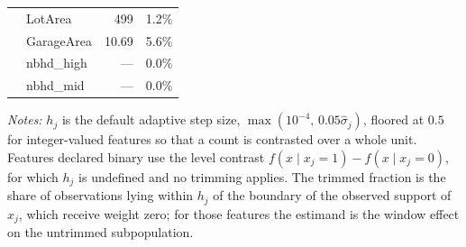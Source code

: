 \begin{table}[htbp]
\begin{threeparttable}
\begin{tabular}{llrr}
 & LotArea & 499 & 1.2\% \\
 & GarageArea & 10.69 & 5.6\% \\
 & nbhd\_high & --- & 0.0\% \\
 & nbhd\_mid & --- & 0.0\% \\
\bottomrule
\end{tabular}
\begin{tablenotes}
\footnotesize
\item \textit{Notes:} $h_j$ is the default adaptive step size, $\max(10^{-4},\, 0.05\hat{\sigma}_j)$, floored at $0.5$ for integer-valued features so that a count is contrasted over a whole unit. Features declared binary use the level contrast $f(x \mid x_j=1) - f(x \mid x_j=0)$, for which $h_j$ is undefined and no trimming applies. The trimmed fraction is the share of observations lying within $h_j$ of the boundary of the observed support of $x_j$, which receive weight zero; for those features the estimand is the window effect on the untrimmed subpopulation.
\end{tablenotes}
\end{threeparttable}
\end{table}